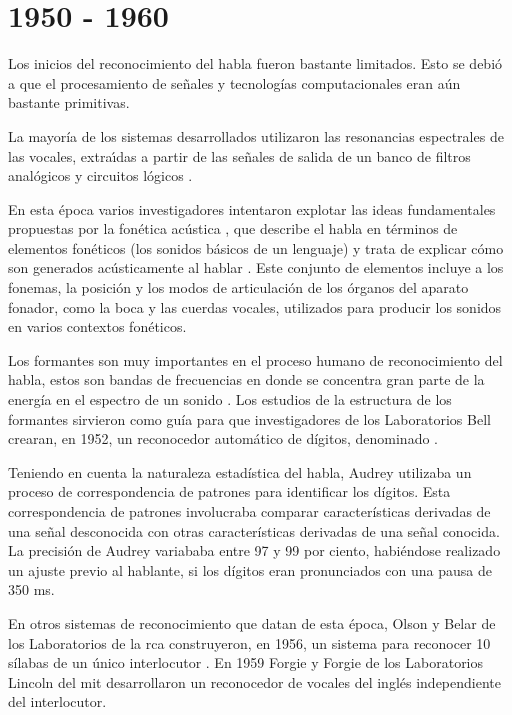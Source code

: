 \section{1950 - 1960}
\label{sec:50s}

Los inicios del reconocimiento del habla fueron bastante limitados. Esto se debi\'o a que el procesamiento 
de se\~{n}ales y tecnolog\'{i}as computacionales eran a\'un bastante primitivas. 

La mayor\'{i}a de los sistemas desarrollados utilizaron las resonancias espectrales de las vocales,
extra{\'\i}das a partir de las se\~nales de salida de un banco de filtros anal\'{o}gicos y 
circuitos l\'ogicos \cite{Furui50Years2004}.
 
En esta \'{e}poca varios investigadores intentaron explotar las ideas fundamentales propuestas por 
la fon\'{e}tica ac\'{u}stica \cite{AnusuyaSpeech2009}, que describe el habla en t\'{e}rminos de 
elementos fon\'{e}ticos (los sonidos b\'{a}sicos de un lenguaje) y trata de
explicar c\'{o}mo son generados ac\'{u}sticamente al hablar \cite{JuangAutomaticSpeech}. 
Este conjunto de elementos incluye a los fonemas, la posici\'on y los modos de articulaci\'on 
de los \'organos del aparato fonador, como la boca y las cuerdas vocales, utilizados para 
producir los sonidos en varios contextos fon\'{e}ticos.

Los formantes son muy importantes en el proceso humano de reconocimiento del habla, estos son 
bandas de frecuencias en donde se concentra gran parte de la energ\'{i}a en el espectro de un 
sonido \cite{HawkinsAcoustic2009}. Los estudios de la estructura de los formantes sirvieron 
como gu\'{i}a para que investigadores de los Laboratorios Bell crearan, en 1952, un reconocedor
autom\'{a}tico de d\'{i}gitos, denominado  \cite{DavisAutomatic1952}.

Teniendo en cuenta la naturaleza estad\'{i}stica del habla, Audrey utilizaba un proceso de 
correspondencia de patrones para identificar los d\'{i}gitos. Esta correspondencia de patrones 
involucraba comparar caracter\'{i}sticas derivadas de una se\~{n}al desconocida con otras 
caracter\'{i}sticas derivadas de una se\~{n}al conocida. La precisi\'{o}n de
Audrey variababa entre 97 y 99 por ciento, habi\'endose realizado un ajuste previo al hablante,
si los d\'{i}gitos eran pronunciados con una pausa de 350 ms\cite{DavisAutomatic1952}.

En otros sistemas de reconocimiento que datan de esta \'{e}poca, Olson y Belar de los Laboratorios 
de la \gls{rca} construyeron, en 1956, un sistema para reconocer 10 s\'{i}labas de un \'{u}nico 
interlocutor \cite{OlsonPhonetic1956}. En 1959 Forgie y Forgie de los Laboratorios Lincoln del \gls{mit} 
desarrollaron un reconocedor de vocales del ingl\'{e}s independiente del 
interlocutor\cite{ForgieResults1959}.

